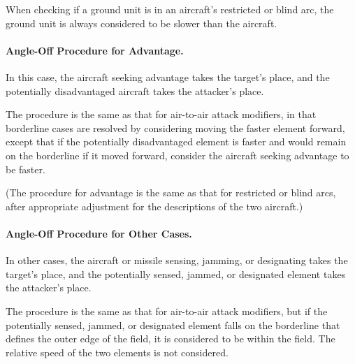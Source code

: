 {{When checking if a ground unit is in an aircraft's restricted or blind arc, the ground unit is always considered to be slower than the aircraft.

\paragraph{Angle-Off Procedure for Advantage.}
In this case, the aircraft seeking advantage takes the target's place, and the potentially disadvantaged aircraft takes the attacker's place.

The procedure is the same as that for air-to-air attack modifiers, in that borderline cases are resolved by considering moving the faster element forward, except that if the potentially disadvantaged element is faster and would remain on the borderline if it moved forward, consider the aircraft seeking advantage to be faster.

(The procedure for advantage is the same as that for restricted or blind arcs, after appropriate adjustment for the descriptions of the two aircraft.)

\paragraph{Angle-Off Procedure for Other Cases.}
In other cases, the aircraft or missile sensing, jamming, or designating takes the target's place, and the potentially sensed, jammed, or designated element takes the attacker's place. 

The procedure is the same as that for air-to-air attack modifiers, but if the potentially sensed, jammed, or designated element falls on the borderline that defines the outer edge of the field, it is considered to be within the field. The relative speed of the two elements is not considered.

}
}

